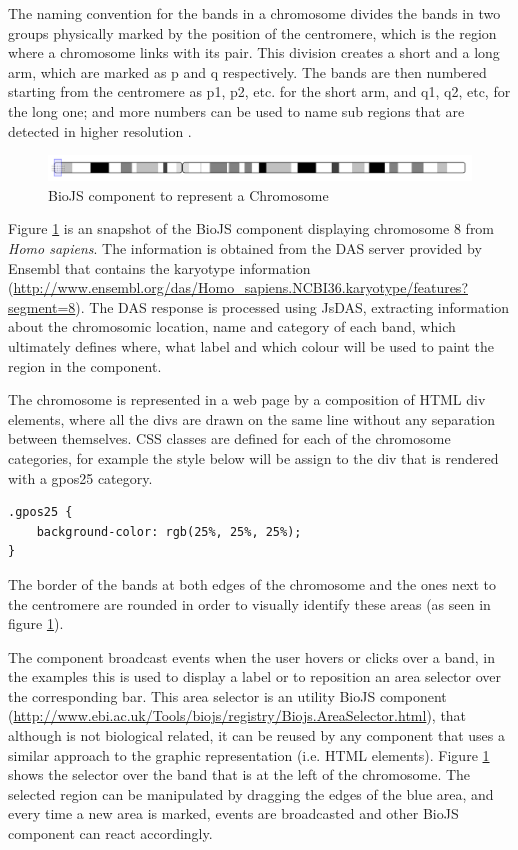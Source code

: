 The naming convention for the bands in a chromosome divides the bands in two groups physically marked by the position of the centromere, which is the region where a chromosome links with its pair. This division creates a short and a long arm, which are marked as p and q respectively. The bands are then numbered starting from the centromere as p1, p2, etc. for the short arm, and q1, q2, etc, for the long one; and more numbers can be used to name sub regions that are detected in higher resolution \cite{NLM2013}.

\begin{figure}[ht]
\centering
\includegraphics[width=\textwidth]{figures/chromosome.png}
\caption[BioJS component to represent a Chromosome]{BioJS component to represent a Chromosome
\label{fig:biojs_chromosome}}
\end{figure}

Figure \ref{fig:biojs_chromosome} is an snapshot of the BioJS component displaying chromosome 8 from \emph{Homo sapiens}. The information is obtained from the DAS server provided by Ensembl that contains the karyotype information (\url{http://www.ensembl.org/das/Homo_sapiens.NCBI36.karyotype/features?segment=8}). The DAS response is processed using JsDAS, extracting information about the chromosomic location, name and category of each band, which ultimately defines where, what label and which colour will be used to paint the region in the component.

The chromosome is represented in a web page by a composition of HTML div elements, where all the divs are drawn on the same line without any separation between themselves. CSS classes are defined for each of the chromosome categories, for example the style below will be assign to the div that is rendered with a gpos25  category.

\begin{lstlisting}[language=HTML]
.gpos25 {
	background-color: rgb(25%, 25%, 25%);
}
\end{lstlisting}

The border of the bands at both edges of the chromosome and the ones next to the centromere are rounded in order to visually identify these areas (as seen in figure \ref{fig:biojs_chromosome}).

The component broadcast events when the user hovers or clicks over a band, in the examples this is used to display a label or to reposition an area selector over the corresponding bar. This area selector is an utility BioJS component (\url{http://www.ebi.ac.uk/Tools/biojs/registry/Biojs.AreaSelector.html}), that although is not biological related, it can be reused by any component that uses a similar approach to the graphic representation (i.e. HTML elements). Figure \ref{fig:biojs_chromosome} shows the selector over the band that is at the left of the chromosome. The selected region can be manipulated by dragging the edges of the blue area, and every time a new area is marked, events are broadcasted and other BioJS component can react accordingly.


